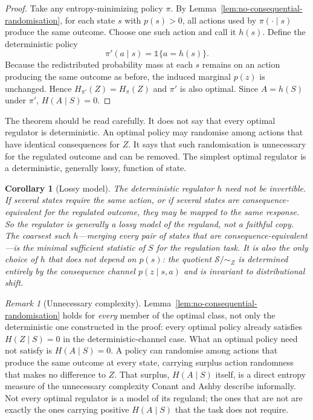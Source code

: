 \documentclass[11pt]{article}
\newtheorem{corollary}{Corollary}
\theoremstyle{remark}
\newtheorem{remark}{Remark}
\newcommand{\Scal}{\mathcal S}
\newcommand{\1}{\mathbb 1}
\begin{document}
\begin{proof}
Take any entropy-minimizing policy $\pi$. By Lemma~\ref{lem:no-consequential-randomisation}, for each state $s$ with $p(s)>0$, all actions used by $\pi(\cdot\mid s)$ produce the same outcome. Choose one such action and call it $h(s)$. Define the deterministic policy
\begin{equation}
    \pi'(a\mid s)=\1\{a=h(s)\}.
\end{equation}
Because the redistributed probability mass at each $s$ remains on an action producing the same outcome as before, the induced marginal $p(z)$ is unchanged. Hence $H_{\pi'}(Z)=H_\pi(Z)$ and $\pi'$ is also optimal. Since $A=h(S)$ under $\pi'$, $H(A\mid S)=0$.
\end{proof}

The theorem should be read carefully. It does not say that every optimal regulator is deterministic. An optimal policy may randomise among actions that have identical consequences for $Z$. It says that such randomisation is unnecessary for the regulated outcome and can be removed. The simplest optimal regulator is a deterministic, generally lossy, function of state.

\begin{corollary}[Lossy model]
The deterministic regulator $h$ need not be invertible. If several states require the same action, or if several states are consequence-equivalent for the regulated outcome, they may be mapped to the same response. So the regulator is generally a lossy model of the reguland, not a faithful copy. The coarsest such $h$---merging every pair of states that are consequence-equivalent---is the minimal sufficient statistic of $S$ for the regulation task. It is also the only choice of $h$ that does not depend on $p(s)$: the quotient $\Scal/{\sim_Z}$ is determined entirely by the consequence channel $p(z\mid s,a)$ and is invariant to distributional shift.
\end{corollary}

\begin{remark}[Unnecessary complexity]
Lemma~\ref{lem:no-consequential-randomisation} holds for \emph{every} member of the optimal class, not only the deterministic one constructed in the proof: every optimal policy already satisfies $H(Z\mid S)=0$ in the deterministic-channel case. What an optimal policy need not satisfy is $H(A\mid S)=0$. A policy can randomise among actions that produce the same outcome at every state, carrying surplus action randomness that makes no difference to $Z$. That surplus, $H(A\mid S)$ itself, is a direct entropy measure of the unnecessary complexity Conant and Ashby describe informally. Not every optimal regulator is a model of its reguland; the ones that are not are exactly the ones carrying positive $H(A\mid S)$ that the task does not require.
\end{remark}
\end{document}
